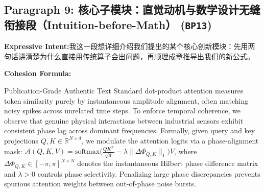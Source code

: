 \subsection*{Paragraph 9: 核心子模块：直觉动机与数学设计无缝衔接段（Intuition-before-Math） (\texttt{BP13})}
\noindent\textbf{Expressive Intent:}\enspace 我这一段想详细介绍我们提出的某个核心创新模块：先用两句话讲清楚为什么直接用传统算子会出问题，再顺理成章推导出我们的新公式。\par
\noindent\textbf{Cohesion Formula:}\par\vspace{4pt}
\begin{ExampleBox}{Publication-Grade Authentic Text}
Standard dot-product attention measures token similarity purely by instantaneous amplitude alignment, often matching noisy spikes across unrelated time steps. To enforce temporal coherence, we observe that genuine physical interactions between industrial sensors exhibit consistent phase lag across dominant frequencies. Formally, given query and key projections $Q, K \in \mathbb{R}^{N \times d}$, we modulate the attention logits via a phase-alignment mask: $\mathcal{A}(Q, K, V) = \text{softmax}\big(\frac{QK^\top}{\sqrt{d}} - \lambda \|\Delta \Phi_{Q,K}\|_1\big)V$, where $\Delta \Phi_{Q,K} \in [-\pi, \pi]^{N \times N}$ denotes the instantaneous Hilbert phase difference matrix and $\lambda > 0$ controls phase selectivity. Penalizing large phase discrepancies prevents spurious attention weights between out-of-phase noise bursts.
\end{ExampleBox}
